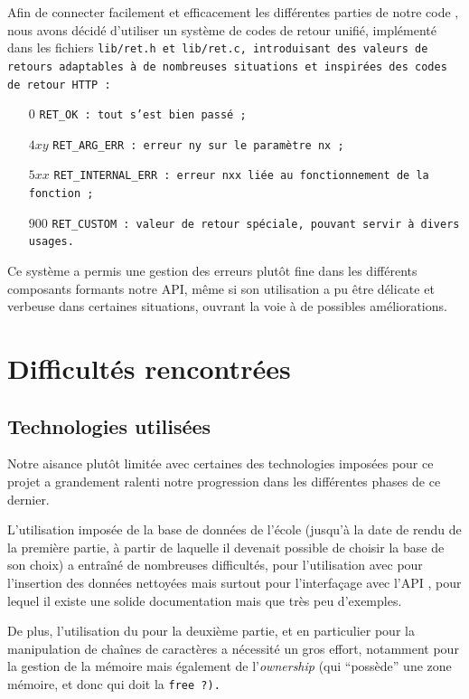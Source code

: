 \documentclass[a4paper, 11pt, twoside]{book}
\begin{document}
Afin de connecter facilement et efficacement les différentes parties de notre code , nous avons décidé d'utiliser un système de codes de retour unifié, implémenté dans les fichiers \tt{lib/ret.h} et \tt{lib/ret.c}, introduisant des valeurs de retours adaptables à de nombreuses situations et inspirées des codes de retour HTTP :
\begin{itemize}
\item[$0$] \tt{RET\_OK} : tout s'est bien passé~;
\item[$4xy$] \tt{RET\_ARG\_ERR} : erreur n\tt{y} sur le paramètre n\tt{x}~;
\item[$5xx$] \tt{RET\_INTERNAL\_ERR} : erreur n\tt{xx} liée au fonctionnement de la fonction~;
\item[$900$] \tt{RET\_CUSTOM} : valeur de retour spéciale, pouvant servir à divers usages.
\end{itemize}

Ce système a permis une gestion des erreurs plutôt fine dans les différents composants formants notre API, même si son utilisation a pu être délicate et verbeuse dans certaines situations, ouvrant la voie à de possibles améliorations.


\chapter{Difficultés rencontrées}

\section{Technologies utilisées}

Notre aisance plutôt limitée avec certaines des technologies imposées pour ce projet a grandement ralenti notre progression dans les différentes phases de ce dernier.

L'utilisation imposée de la base de données  de l'école (jusqu'à la date de rendu de la première partie, à partir de laquelle il devenait possible de choisir la base de son choix) a entraîné de nombreuses difficultés, pour l'utilisation avec  pour l'insertion des données nettoyées mais surtout pour l'interfaçage avec l'API , pour lequel il existe une solide documentation mais que très peu d'exemples.

De plus, l'utilisation du  pour la deuxième partie, et en particulier pour la manipulation de chaînes de caractères a nécessité un gros effort, notamment pour la gestion de la mémoire mais également de l'\emph{ownership} (qui ``possède'' une zone mémoire, et donc qui doit la \tt{free} ?).
\end{document}
